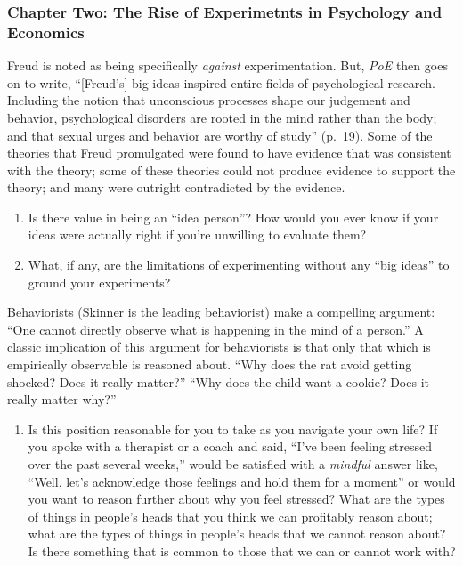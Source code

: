 \documentclass[
]{article}
\providecommand{\tightlist}{%
  \setlength{\itemsep}{0pt}\setlength{\parskip}{0pt}}
\theoremstyle{definition}
\theoremstyle{definition}
\theoremstyle{definition}
\theoremstyle{definition}
\theoremstyle{remark}
\begin{document}
\subsubsection{Chapter Two: The Rise of Experimetnts in Psychology and Economics}\label{chapter-two-the-rise-of-experimetnts-in-psychology-and-economics}

Freud is noted as being specifically \emph{against} experimentation. But, \emph{PoE} then goes on to write, ``{[}Freud's{]} big ideas inspired entire fields of psychological research. Including the notion that unconscious processes shape our judgement and behavior, psychological disorders are rooted in the mind rather than the body; and that sexual urges and behavior are worthy of study'' (p.~19). Some of the theories that Freud promulgated were found to have evidence that was consistent with the theory; some of these theories could not produce evidence to support the theory; and many were outright contradicted by the evidence.

\begin{enumerate}
\def\labelenumi{\arabic{enumi}.}
\tightlist
\item
  Is there value in being an ``idea person''? How would you ever know if your ideas were actually right if you're unwilling to evaluate them?
\item
  What, if any, are the limitations of experimenting without any ``big ideas'' to ground your experiments?
\end{enumerate}

Behaviorists (Skinner is the leading behaviorist) make a compelling argument: ``One cannot directly observe what is happening in the mind of a person.'' A classic implication of this argument for behaviorists is that only that which is empirically observable is reasoned about. ``Why does the rat avoid getting shocked? Does it really matter?'' ``Why does the child want a cookie? Does it really matter why?''

\begin{enumerate}
\def\labelenumi{\arabic{enumi}.}
\tightlist
\item
  Is this position reasonable for you to take as you navigate your own life? If you spoke with a therapist or a coach and said, ``I've been feeling stressed over the past several weeks,'' would be satisfied with a \emph{mindful} answer like, ``Well, let's acknowledge those feelings and hold them for a moment'' or would you want to reason further about why you feel stressed? What are the types of things in people's heads that you think we can profitably reason about; what are the types of things in people's heads that we cannot reason about? Is there something that is common to those that we can or cannot work with?
\end{enumerate}
\end{document}
